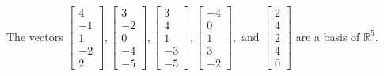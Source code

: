 \begin{exercise}
\begin{exerciseStatement}
  \end{exerciseStatement}
  \begin{exerciseAnswer}
   The vectors \(\left[\begin{array}{r}
4 \\
-1 \\
1 \\
-2 \\
2
\end{array}\right] , \left[\begin{array}{r}
3 \\
-2 \\
0 \\
-4 \\
-5
\end{array}\right] , \left[\begin{array}{r}
3 \\
4 \\
1 \\
-3 \\
-5
\end{array}\right] , \left[\begin{array}{r}
-4 \\
0 \\
1 \\
3 \\
-2
\end{array}\right] , \text{ and } \left[\begin{array}{r}
2 \\
4 \\
2 \\
4 \\
0
\end{array}\right]\) 
  	 are  a basis of \(\mathbb{R}^5\).
  


  \end{exerciseAnswer}
\end{exercise}